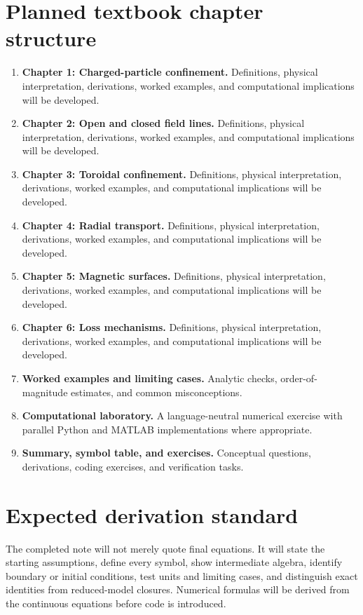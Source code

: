 \documentclass[11pt]{article}
\begin{document}
\section{Planned textbook chapter structure}
\begin{enumerate}[leftmargin=1.8em]
\item \textbf{Chapter 1: Charged-particle confinement.} Definitions, physical interpretation, derivations, worked examples, and computational implications will be developed.
\item \textbf{Chapter 2: Open and closed field lines.} Definitions, physical interpretation, derivations, worked examples, and computational implications will be developed.
\item \textbf{Chapter 3: Toroidal confinement.} Definitions, physical interpretation, derivations, worked examples, and computational implications will be developed.
\item \textbf{Chapter 4: Radial transport.} Definitions, physical interpretation, derivations, worked examples, and computational implications will be developed.
\item \textbf{Chapter 5: Magnetic surfaces.} Definitions, physical interpretation, derivations, worked examples, and computational implications will be developed.
\item \textbf{Chapter 6: Loss mechanisms.} Definitions, physical interpretation, derivations, worked examples, and computational implications will be developed.
\item \textbf{Worked examples and limiting cases.} Analytic checks, order-of-magnitude estimates, and common misconceptions.
\item \textbf{Computational laboratory.} A language-neutral numerical exercise with parallel Python and MATLAB implementations where appropriate.
\item \textbf{Summary, symbol table, and exercises.} Conceptual questions, derivations, coding exercises, and verification tasks.
\end{enumerate}

\section{Expected derivation standard}
The completed note will not merely quote final equations. It will state the starting assumptions, define every symbol, show intermediate algebra, identify boundary or initial conditions, test units and limiting cases, and distinguish exact identities from reduced-model closures. Numerical formulas will be derived from the continuous equations before code is introduced.
\end{document}
